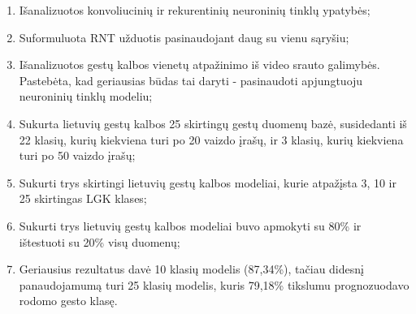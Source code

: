 \documentclass{VUMIFPSbakalaurinis}
\begin{document}

\begin{enumerate}
	\item Išanalizuotos konvoliucinių ir rekurentinių neuroninių tinklų ypatybės;
	\item Suformuluota RNT užduotis pasinaudojant daug su vienu sąryšiu;
	\item Išanalizuotos gestų kalbos vienetų atpažinimo iš video srauto galimybės. Pastebėta, kad geriausias būdas tai daryti - pasinaudoti apjungtuoju neuroninių tinklų modeliu;
	\item Sukurta lietuvių gestų kalbos 25 skirtingų gestų duomenų bazė, susidedanti iš 22 klasių, kurių kiekviena turi po 20 vaizdo įrašų, ir 3 klasių, kurių kiekviena turi po 50 vaizdo įrašų;
	\item Sukurti trys skirtingi lietuvių gestų kalbos modeliai, kurie atpažįsta 3, 10 ir 25 skirtingas LGK klases;
	\item Sukurti trys lietuvių gestų kalbos modeliai buvo apmokyti su 80\% ir ištestuoti su 20\% visų duomenų;
	\item Geriausius rezultatus davė 10 klasių modelis (87,34\%), tačiau didesnį panaudojamumą turi 25 klasių modelis, kuris 79,18\% tikslumu prognozuodavo rodomo gesto klasę.
\end{enumerate}
\end{document}
